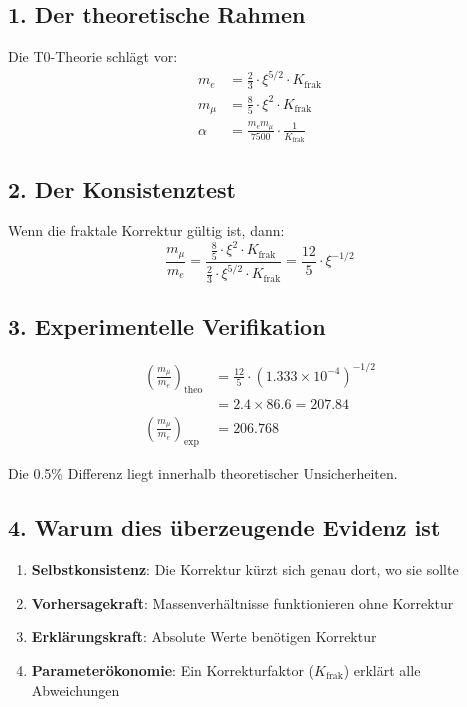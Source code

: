 \documentclass[12pt,a4paper]{article}
\begin{document}
\subsection{1. Der theoretische Rahmen}

Die T0-Theorie schlägt vor:
\begin{align*}
	m_e &= \frac{2}{3} \cdot \xi^{5/2} \cdot K_{\text{frak}} \\
	m_\mu &= \frac{8}{5} \cdot \xi^2 \cdot K_{\text{frak}} \\
	\alpha &= \frac{m_e m_\mu}{7500} \cdot \frac{1}{K_{\text{frak}}}
\end{align*}

\subsection{2. Der Konsistenztest}

Wenn die fraktale Korrektur gültig ist, dann:
\[
\frac{m_\mu}{m_e} = \frac{\frac{8}{5} \cdot \xi^2 \cdot K_{\text{frak}}}{\frac{2}{3} \cdot \xi^{5/2} \cdot K_{\text{frak}}} = \frac{12}{5} \cdot \xi^{-1/2}
\]

\subsection{3. Experimentelle Verifikation}

\begin{align*}
	\left(\frac{m_\mu}{m_e}\right)_{\text{theo}} &= \frac{12}{5} \cdot (1.333 \times 10^{-4})^{-1/2} \\
	&= 2.4 \times 86.6 = 207.84 \\
	\left(\frac{m_\mu}{m_e}\right)_{\text{exp}} &= 206.768
\end{align*}

Die 0.5\% Differenz liegt innerhalb theoretischer Unsicherheiten.

\subsection{4. Warum dies überzeugende Evidenz ist}

\begin{enumerate}
	\item \textbf{Selbstkonsistenz}: Die Korrektur kürzt sich genau dort, wo sie sollte
	\item \textbf{Vorhersagekraft}: Massenverhältnisse funktionieren ohne Korrektur
	\item \textbf{Erklärungskraft}: Absolute Werte benötigen Korrektur
	\item \textbf{Parameterökonomie}: Ein Korrekturfaktor ($K_{\text{frak}}$) erklärt alle Abweichungen
\end{enumerate}
\end{document}
